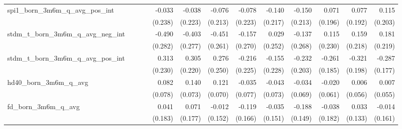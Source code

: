 \begin{tabular}{lrrrrrrrrrrrr}
spi1\_born\_3m6m\_q\_avg\_pos\_int          &              &              &              &       -0.033 &       -0.038 &       -0.076 &       -0.078 &       -0.140 &       -0.150 &        0.071 &        0.077 &        0.115 \\ 
                                            &              &              &              &      (0.238) &      (0.223) &      (0.213) &      (0.223) &      (0.217) &      (0.213) &      (0.196) &      (0.192) &      (0.203) \\ 
stdm\_t\_born\_3m6m\_q\_avg\_neg\_int       &              &              &              &       -0.490 &       -0.403 &       -0.451 &       -0.157 &        0.029 &       -0.137 &        0.115 &        0.159 &        0.181 \\ 
                                            &              &              &              &      (0.282) &      (0.277) &      (0.261) &      (0.270) &      (0.252) &      (0.268) &      (0.230) &      (0.218) &      (0.219) \\ 
stdm\_t\_born\_3m6m\_q\_avg\_pos\_int       &              &              &              &        0.313 &        0.305 &        0.276 &       -0.216 &       -0.155 &       -0.232 &       -0.261 &       -0.321 &       -0.287 \\ 
                                            &              &              &              &      (0.230) &      (0.220) &      (0.250) &      (0.225) &      (0.228) &      (0.203) &      (0.185) &      (0.198) &      (0.177) \\ 
hd40\_born\_3m6m\_q\_avg                    &              &              &              &        0.082 &        0.140 &        0.121 &       -0.035 &       -0.043 &       -0.034 &       -0.020 &        0.006 &        0.007 \\ 
                                            &              &              &              &      (0.078) &      (0.073) &      (0.070) &      (0.077) &      (0.073) &      (0.069) &      (0.061) &      (0.056) &      (0.055) \\ 
fd\_born\_3m6m\_q\_avg                      &              &              &              &        0.041 &        0.071 &       -0.012 &       -0.119 &       -0.035 &       -0.188 &       -0.038 &        0.033 &       -0.014 \\ 
                                            &              &              &              &      (0.183) &      (0.177) &      (0.152) &      (0.166) &      (0.151) &      (0.149) &      (0.182) &      (0.133) &      (0.161) \\ 

\end{tabular}
